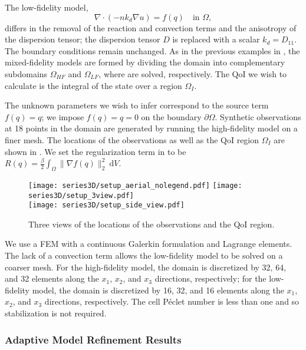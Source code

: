 The low-fidelity model,
%
\begin{equation}
\nabla\cdot(- nk_d\nabla u) = f(q) \quad \text{in } \Omega, \label{eq:LFeq3D}
\end{equation}
%
differs in the removal of the reaction and convection terms and the anisotropy of the dispersion tensor; the dispersion tensor $D$ is replaced with a scalar $k_d=D_{11}$. The boundary conditions remain unchanged. As in the previous examples in , the mixed-fidelity models are formed by dividing the domain into complementary subdomains $\Omega_{HF}$ and $\Omega_{LF}$, where  are solved, respectively. The QoI we wish to calculate is the integral of the state over a region $\Omega_I$.

The unknown parameters we wish to infer correspond to the source term $f(q)=q$; we impose $f(q)=q=0$ on the boundary $\partial\Omega$. Synthetic observations at 18 points in the domain are generated by running the high-fidelity model on a finer mesh. The locations of the observations as well as the QoI region $\Omega_I$ are shown in . We set the regularization term in  to be $R(q)=\frac{\beta}{2}\int_\Omega \|\nabla f(q)\|_2^2\:\textrm{d}V$.
%
\begin{figure}[htbp]
\centering
\texttt{[image: series3D/setup\_aerial\_nolegend.pdf]} \hfill
\texttt{[image: series3D/setup\_3view.pdf]} \\
\vspace{\baselineskip}
\texttt{[image: series3D/setup\_side\_view.pdf]}
\caption{Three views of the locations of the observations and the QoI region.}
\label{fig:setup3D}
\end{figure}
%

We use a FEM with a continuous Galerkin formulation and Lagrange elements. The lack of a convection term allows the low-fidelity model to be solved on a coarser mesh. For the high-fidelity model, the domain is discretized by 32, 64, and 32 elements along the $x_1$, $x_2$, and $x_3$ directions, respectively; for the low-fidelity model, the domain is discretized by 16, 32, and 16 elements along the $x_1$, $x_2$, and $x_3$ directions, respectively. The cell P\'{e}clet number is less than one and so stabilization is not required.

\subsubsection{Adaptive Model Refinement Results} \label{sec:ref3D_diffmesh}

